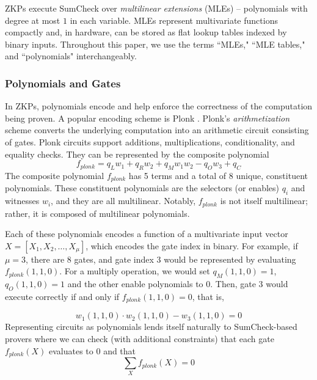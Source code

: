 ZKPs execute SumCheck over \textit{multilinear extensions} (MLEs) -- polynomials with degree at most $1$ in each variable. MLEs represent multivariate functions compactly and, in hardware, can be stored as flat lookup tables indexed by binary inputs. Throughout this paper, we use the terms ``MLEs," ``MLE tables," and ``polynomials" interchangeably.

\subsubsection{\textbf{Polynomials and Gates}}
In ZKPs, polynomials encode and help enforce the correctness of the computation being proven. A popular encoding scheme is Plonk \cite{gabizon2019plonk}. Plonk's \textit{arithmetization} scheme converts the underlying computation into an arithmetic circuit consisting of gates. Plonk circuits support additions, multiplications, conditionality, and equality checks. They can be represented by the composite polynomial 
\begin{equation*}
\label{eq:plonk}
    f_{plonk} = q_Lw_1 + q_Rw_2 + q_Mw_1w_2 - q_Ow_3 + q_C
\end{equation*}
The composite polynomial $f_{plonk}$ has 5 terms and a total of 8 unique, constituent polynomials.
These constituent polynomials are the selectors (or enables) $q_i$ and witnesses $w_i$, and they are all multilinear.
Notably, 
$f_{plonk}$
is not itself multilinear; rather, it is composed of multilinear polynomials.

Each of these polynomials encodes a function of a multivariate input vector $X=[X_1, X_2, \ldots, X_\mu]$, which encodes the gate index in binary. For example, if $\mu = 3$, there are 8 gates, and gate index 3 would be represented by evaluating $f_{plonk}(1, 1, 0)$. For a multiply operation, we would set $q_M(1, 1, 0) = 1$, $q_O(1, 1, 0) = 1$ and the other enable polynomials to $0$. Then, gate 3 would execute correctly if and only if $f_{plonk}(1, 1, 0) = 0$, that is, 

\begin{equation*}
w_1(1,1,0)\cdot w_2(1,1,0) - w_3(1,1,0) = 0
\end{equation*}
Representing circuits as polynomials lends itself naturally to SumCheck-based provers where we can check (with additional constraints) that each gate $f_{plonk}(X)$ evaluates to $0$ and that
\begin{equation*}
\sum_X f_{plonk}(X) = 0 
\end{equation*}


